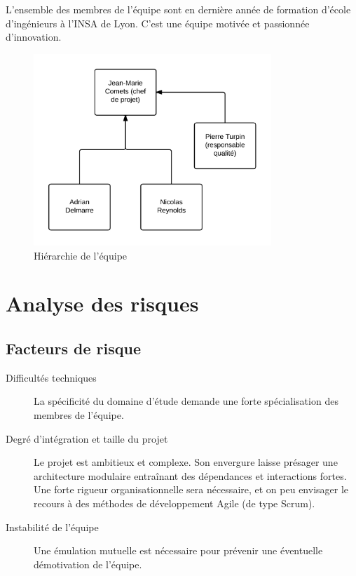 L'ensemble des membres de l'équipe sont en dernière année de formation d'école
d'ingénieurs à l'INSA de Lyon. C'est une équipe motivée et passionnée
d'innovation.

\begin{figure}[!htb]
    \centering
    \includegraphics[width=0.8\textwidth]{hierarchie}
    \caption{Hiérarchie de l'équipe}
    \label{fig:hierarchie}
\end{figure}

\section{Analyse des risques}

\subsection{Facteurs de risque}

\begin{description}
    \item[Difficultés techniques] La spécificité du domaine d'étude demande une
        forte spécialisation des membres de l'équipe.
    \item[Degré d'intégration et taille du projet] Le projet est ambitieux et
        complexe. Son envergure laisse présager une architecture modulaire
        entraînant des dépendances et interactions fortes. Une forte rigueur
        organisationnelle sera nécessaire, et on peu envisager le recours à des
        méthodes de développement Agile (de type Scrum).
    \item[Instabilité de l'équipe] Une émulation mutuelle est nécessaire pour
        prévenir une éventuelle démotivation de l'équipe.
\end{description}


